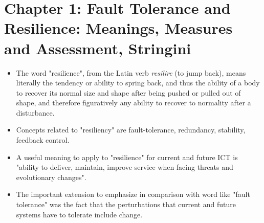 \section{Chapter 1: Fault Tolerance and Resilience: Meanings, Measures and Assessment, Stringini}

\begin{itemize}
  \item The word "resilience", from the Latin verb \textit{resilire} (to jump back), means literally the tendency or ability to spring back, and thus the ability of a body to recover its normal size and shape after being pushed or pulled out of shape, and therefore figuratively any ability to recover to normality after a disturbance.
  \item Concepts related to "resiliency" are fault-tolerance, redundancy, stability, feedback control.
  \item A useful meaning to apply to "resilience" for current and future ICT is "ability to deliver, maintain, improve service when facing threats and evolutionary changes".
  \item The important extension to emphasize in comparison with word like "fault tolerance" was the fact that the perturbations that current and future systems have to tolerate include change.
\end{itemize}

